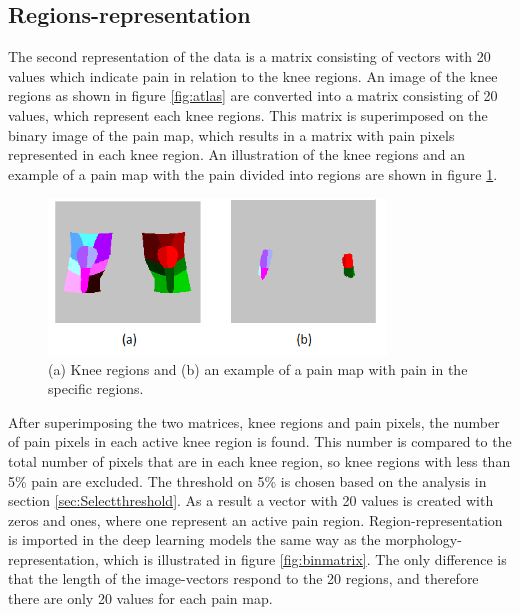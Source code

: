 \subsection{Regions-representation}
The second representation of the data is a matrix consisting of vectors with 20 values which indicate pain in relation to the knee regions.
An image of the knee regions as shown in figure \ref{fig:atlas} are converted into a matrix consisting of 20 values, which represent each knee regions. This matrix is superimposed on the binary image of the pain map, which results in a matrix with pain pixels represented in each knee region. 
An illustration of the knee regions and an example of a pain map with the pain divided into regions are shown in figure \ref{fig:binregions}.

\begin{figure} [H]
\centering
\includegraphics[width=0.8\textwidth]{figures/binregions}
\caption{(a) Knee regions and (b) an example of a pain map with pain in the specific regions.}
\label{fig:binregions}
\end{figure}

\noindent
After superimposing the two matrices, knee regions and pain pixels, the number of pain pixels in each active knee region is found. This number is compared to the total number of pixels that are in each knee region, so knee regions with less than 5\% pain are excluded. The threshold on 5\% is chosen based on the analysis in section \ref{sec:Selectthreshold}. As a result a vector with 20 values is created with zeros and ones, where one represent an active pain region. Region-representation is imported in the deep learning models the same way as the morphology-representation, which is illustrated in figure \ref{fig:binmatrix}. The only difference is that the length of the image-vectors respond to the 20 regions, and therefore there are only 20 values for each pain map.


